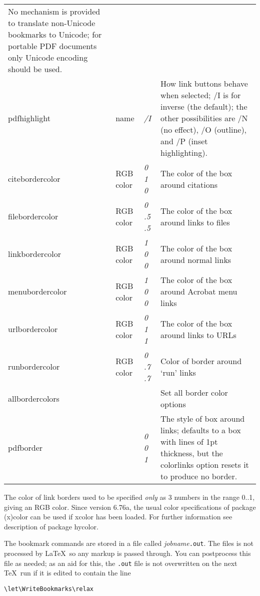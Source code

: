 \documentclass{article}
\newcommand*{\xpackage}[1]{\textsf{#1}}
\begin{document}
\begin{longtable}{@{}>{\ttfamily}ll>{\itshape}lp{7.6cm}@{}}
    No mechanism is provided to translate non-Unicode bookmarks to
    Unicode; for portable PDF documents only Unicode encoding should
    be used.\\
pdfhighlight       & name      & /I      & How link buttons behave when selected; /I is for inverse (the default);
                                           the other possibilities are /N (no effect), /O (outline), and /P (inset
                                           highlighting). \\
citebordercolor    & RGB color & 0 1 0   & The color of the box around citations \\
filebordercolor    & RGB color & 0 .5 .5 & The color of the box around links to files \\
linkbordercolor    & RGB color & 1 0 0   & The color of the box around normal links \\
menubordercolor    & RGB color & 1 0 0   & The color of the box around Acrobat menu links \\
urlbordercolor     & RGB color & 0 1 1   & The color of the box around links to URLs \\
runbordercolor     & RGB color & 0 .7 .7 & Color of border around `run' links \\
allbordercolors    &           &         & Set all border color options \\
pdfborder          &           & 0 0 1   & The style of box around links; defaults to a box with lines of 1pt thickness,
                                           but the colorlinks option resets it to produce no border.
\end{longtable}

The color of link borders used to be specified \emph{only} as 3
numbers in the range 0..1, giving an RGB color. Since version 6.76a, the usual
color specifications of package \xpackage{(x)color} can be used if \xpackage{xcolor}
has been loaded.
For further information see description of package \xpackage{hycolor}.

The bookmark commands are stored in a file called
\textit{jobname}\texttt{.out}. The files is not processed by \LaTeX\ so
any markup is passed through. You can postprocess this file as needed;
as an aid for this, the \texttt{.out} file is not overwritten on the
next \TeX\ run if it is edited to contain the line
\begin{verbatim}
\let\WriteBookmarks\relax
\end{verbatim}
\end{document}

